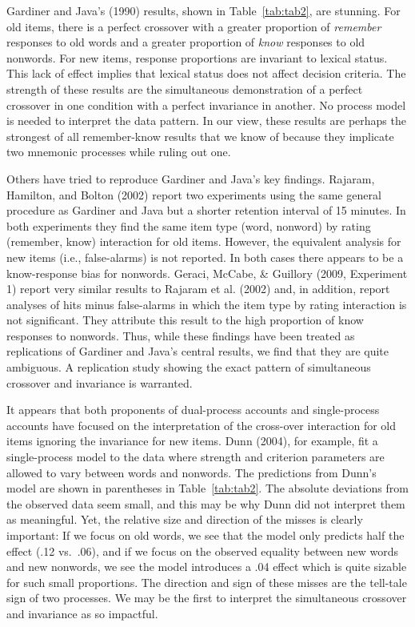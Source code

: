 \documentclass[english,,man,floatsintext]{apa6}
\begin{document}
Gardiner and Java's (1990) results, shown in Table~\ref{tab:tab2}, are stunning. For old items, there is a perfect crossover with a greater proportion of \emph{remember} responses to old words and a greater proportion of \emph{know} responses to old nonwords. For new items, response proportions are invariant to lexical status. This lack of effect implies that lexical status does not affect decision criteria. The strength of these results are the simultaneous demonstration of a perfect crossover in one condition with a perfect invariance in another. No process model is needed to interpret the data pattern. In our view, these results are perhaps the strongest of all remember-know results that we know of because they implicate two mnemonic processes while ruling out one.

Others have tried to reproduce Gardiner and Java's key findings. Rajaram, Hamilton, and Bolton (2002) report two experiments using the same general procedure as Gardiner and Java but a shorter retention interval of 15 minutes. In both experiments they find the same item type (word, nonword) by rating (remember, know) interaction for old items. However, the equivalent analysis for new items (i.e., false-alarms) is not reported. In both cases there appears to be a know-response bias for nonwords. Geraci, McCabe, \& Guillory (2009, Experiment 1) report very similar results to Rajaram et al. (2002) and, in addition, report analyses of hits minus false-alarms in which the item type by rating interaction is not significant. They attribute this result to the high proportion of know responses to nonwords. Thus, while these findings have been treated as replications of Gardiner and Java's central results, we find that they are quite ambiguous. A replication study showing the exact pattern of simultaneous crossover and invariance is warranted.

It appears that both proponents of dual-process accounts and single-process accounts have focused on the interpretation of the cross-over interaction for old items ignoring the invariance for new items. Dunn (2004), for example, fit a single-process model to the data where strength and criterion parameters are allowed to vary between words and nonwords. The predictions from Dunn's model are shown in parentheses in Table~\ref{tab:tab2}. The absolute deviations from the observed data seem small, and this may be why Dunn did not interpret them as meaningful. Yet, the relative size and direction of the misses is clearly important: If we focus on old words, we see that the model only predicts half the effect (.12 vs.~.06), and if we focus on the observed equality between new words and new nonwords, we see the model introduces a .04 effect which is quite sizable for such small proportions. The direction and sign of these misses are the tell-tale sign of two processes. We may be the first to interpret the simultaneous crossover and invariance as so impactful.
\end{document}

